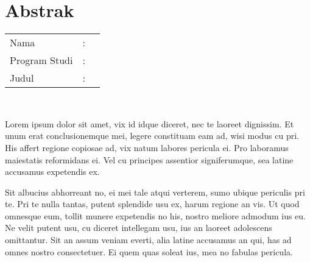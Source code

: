 %
%
%

\chapter*{Abstrak}

\vspace*{0.2cm}

\noindent \begin{tabular}{l l p{10cm}}
	Nama&: & \penulis \\
	Program Studi&: & \program \\
	Judul&: & \judul \\
\end{tabular} \\ 

\vspace*{0.5cm}

Lorem ipsum dolor sit amet, vix id idque diceret, nec te laoreet dignissim. Et unum erat conclusionemque mei, legere constituam eam ad, wisi modus cu pri. His affert regione copiosae ad, vix natum labores pericula ei. Pro laboramus maiestatis reformidans ei. Vel cu principes assentior signiferumque, sea latine accusamus expetendis ex.

Sit albucius abhorreant no, ei mei tale atqui verterem, sumo ubique periculis pri te. Pri te nulla tantas, putent splendide usu ex, harum regione an vis. Ut quod omnesque eum, tollit munere expetendis no his, nostro meliore admodum ius eu. Ne velit putent usu, cu diceret intellegam usu, ius an laoreet adolescens omittantur. Sit an assum veniam everti, alia latine accusamus an qui, has ad omnes nostro consectetuer. Ei quem quas soleat ius, mea no fabulas pericula.





\newpage